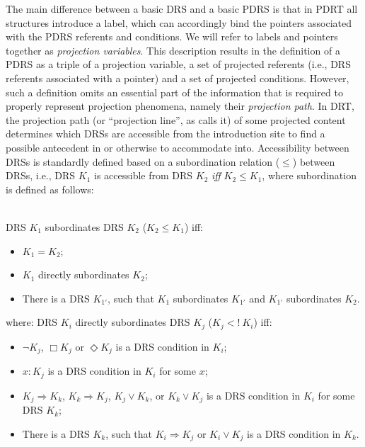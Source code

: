 The main difference between a basic DRS and a basic PDRS is that in PDRT all
structures introduce a label, which can accordingly bind the pointers
associated with the PDRS referents and conditions. We will refer to labels
and pointers together as \textit{projection variables}. This description
results in the definition of a PDRS as a triple of a projection variable,
a set of projected referents (i.e., DRS referents associated with a pointer)
and a set of projected conditions. However, such a definition omits an
essential part of the information that is required to properly represent
projection phenomena, namely their \emph{projection path}. In DRT, the
projection path (or ``projection line'', as
 calls it) of some projected content
determines which DRSs are accessible from the introduction site to find
a possible antecedent in or otherwise to accommodate into. Accessibility
between DRSs is standardly defined based on a subordination relation
($\leq$) between DRSs, i.e., DRS $K_1$ is accessible from DRS $K_2$
\textit{iff} $K_2\leq K_1$, where subordination is defined as follows:

\begin{definition}\label{def:DRSsub}~\\
DRS $K_1$ subordinates DRS $K_2$ ($K_2 \leq K_1$) iff:
  \begin{itemize}
    \item $K_1 = K_2$;
    \item $K_1$ directly subordinates $K_2$;
    \item There is a DRS $K_{1'}$, such that $K_1$ subordinates $K_{1'}$ and 
      $K_{1'}$ subordinates $K_2$.
  \end{itemize}
  where: DRS $K_i$ directly subordinates DRS $K_j$ ($K_j <!~K_i$) iff:
  \begin{itemize}
    \item $\neg K_j$, $\Box K_j$ or $\Diamond K_j$ is a DRS condition in
      $K_i$;
    \item $x:K_j$ is a DRS condition in $K_i$ for some $x$;
    \item $K_j \Rightarrow K_k$, $K_k \Rightarrow K_j$, $K_j \vee K_k$, or 
      $K_k \vee K_j$ is a DRS condition in $K_i$ for some DRS $K_k$;
    \item There is a DRS $K_k$, such that $K_i \Rightarrow K_j$ or $K_i \vee K_j$
      is a DRS condition in $K_k$.
  \end{itemize}
\end{definition}

